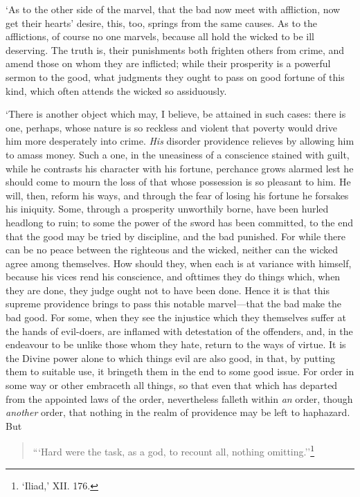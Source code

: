 \documentclass[11pt]{book}
\begin{document}
`As to the other side of the marvel, that the bad now meet with
affliction, now get their hearts' desire, this, too, springs from the
same causes. As to the afflictions, of course no one marvels, because
all hold the wicked to be ill deserving. The truth is, their punishments
both frighten others from crime, and amend those on whom they are
inflicted; while their prosperity is a powerful sermon to the good, what
judgments they ought to pass on good fortune of this kind, which often
attends the wicked so assiduously.

`There is another object which may, I believe, be attained in such
cases: there is one, perhaps, whose nature is so reckless and violent
that poverty would drive him more desperately into crime. \emph{His} disorder
providence relieves by allowing him to amass money. Such a one, in the
uneasiness of a conscience stained with guilt, while he contrasts his
character with his fortune, perchance grows alarmed lest he should come
to mourn the loss of that whose possession is so pleasant to him. He
will, then, reform his ways, and through the fear of losing his fortune
he forsakes his iniquity. Some, through a prosperity unworthily borne,
have been hurled headlong to ruin; to some the power of the sword has
been committed, to the end that the good may be tried by discipline, and
the bad punished. For while there can be no peace between the righteous
and the wicked, neither can the wicked agree among themselves. How
should they, when each is at variance with himself, because his vices
rend his conscience, and ofttimes they do things which, when they are
done, they judge ought not to have been done. Hence it is that this
supreme providence brings to pass this notable marvel---that the bad make
the bad good. For some, when they see the injustice which they
themselves suffer at the hands of evil-doers, are inflamed with
detestation of the offenders, and, in the endeavour to be unlike those
whom they hate, return to the ways of virtue. It is the Divine power
alone to which things evil are also good, in that, by putting them to
suitable use, it bringeth them in the end to some good issue. For order
in some way or other embraceth all things, so that even that which has
departed from the appointed laws of the order, nevertheless falleth
within \emph{an} order, though \emph{another} order, that nothing in the realm of
providence may be left to haphazard. But

\begin{quote}
  ```Hard were the task, as a god, to recount all, nothing omitting.''\footnote{`Iliad,’ XII. 176.}
\end{quote}
\end{document}
